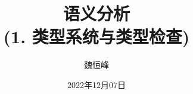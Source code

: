 \documentclass[]{beamer}
\title[类型系统]{语义分析 \\ (1. 类型系统与类型检查)}
\author[魏恒峰]{\large 魏恒峰}
\institute{hfwei@nju.edu.cn}
\date{2022年12月07日}
\begin{document}
\maketitle


\thankyou{}

\end{document}
